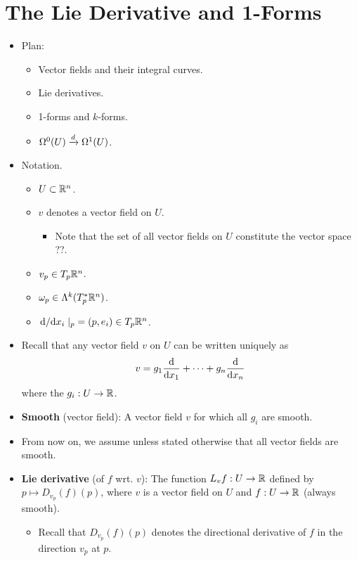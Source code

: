 \documentclass[../notes.tex]{subfiles}
\begin{document}
\section{The Lie Derivative and 1-Forms}
\begin{itemize}
    \item {}Plan:
    \begin{itemize}
        \item Vector fields and their integral curves.
        \item Lie derivatives.
        \item 1-forms and $k$-forms.
        \item $\ome[0]{U}\xrightarrow{d}\ome[1]{U}$.
    \end{itemize}
    \item Notation.
    \begin{itemize}
        \item $U\subset\R^n$.
        \item $v$ denotes a vector field on $U$.
        \begin{itemize}
            \item Note that the set of all vector fields on $U$ constitute the vector space ??.
        \end{itemize}
        \item $v_p\in T_p\R^n$.
        \item $\omega_p\in\lam[k]{T_p^*\R^n}$.
        \item $\dv*{x_i}|_p=(p,e_i)\in T_p\R^n$.
    \end{itemize}
    \item Recall that any vector field $v$ on $U$ can be written uniquely as
    \begin{equation*}
        v = g_1\dv{x_1}+\cdots+g_n\dv{x_n}
    \end{equation*}
    where the $g_i:U\to\R$.
    \item \textbf{Smooth} (vector field): A vector field $v$ for which all $g_i$ are smooth.
    \item From now on, we assume unless stated otherwise that all vector fields are smooth.
    \item \textbf{Lie derivative} (of $f$ wrt. $v$): The function $L_vf:U\to\R$ defined by $p\mapsto D_{v_p}(f)(p)$, where $v$ is a vector field on $U$ and $f:U\to\R$ (always smooth).
    \begin{itemize}
        \item Recall that $D_{v_p}(f)(p)$ denotes the directional derivative of $f$ in the direction $v_p$ at $p$.

\end{itemize}
\end{itemize}
\end{document}
